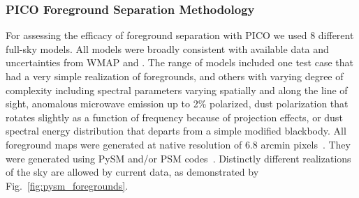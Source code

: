 \documentclass[PICOReport.tex]{subfiles}
\begin{document}


\subsubsection{PICO Foreground Separation Methodology}

For assessing the efficacy of foreground separation with PICO we used 8 different full-sky models. All models were broadly consistent with available data and uncertainties from WMAP and \planck . The range of models included one test case that had a very simple realization of foregrounds, and others with varying degree of complexity including spectral parameters varying spatially and along the line of sight, anomalous microwave emission up to 2\% polarized, dust polarization that rotates slightly as a function of frequency because of projection effects, or dust spectral energy distribution that departs from a simple modified blackbody. All foreground maps were generated at native resolution of 6.8 arcmin pixels~\citep{gorski/etal:2005}. They were generated using PySM and/or PSM codes~\citep{thorne2018_pysm,delabrouille/etal:2013}.   Distinctly different realizations of the sky are allowed by current data, as demonstrated by Fig.~\ref{fig:pysm_foregrounds}. 
\end{document}
